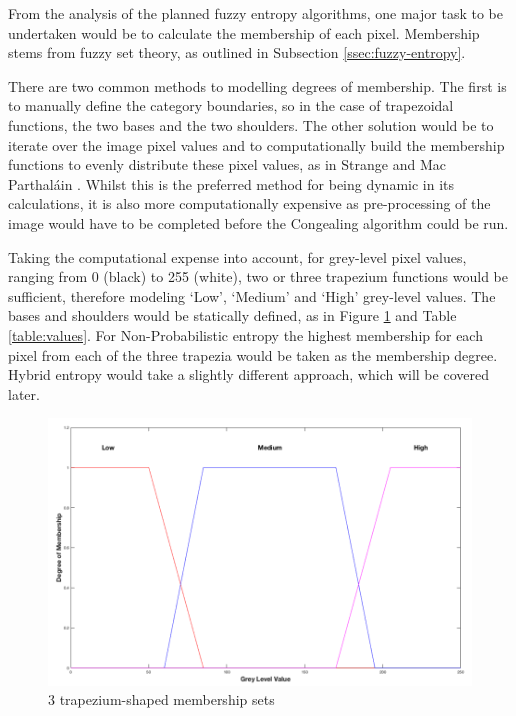 From the analysis of the planned fuzzy entropy algorithms, one major task to be undertaken would be to calculate the membership of each pixel. Membership stems from fuzzy set theory, as outlined in Subsection \ref{ssec:fuzzy-entropy}.

There are two common methods to modelling degrees of membership. The first is to manually define the category boundaries, so in the case of trapezoidal functions, the two bases and the two shoulders. The other solution would be to iterate over the image pixel values and to computationally build the membership functions to evenly distribute these pixel values, as in Strange and Mac Parthal\'ain \cite{Mac_Parthalain_Strange_2013}. Whilst this is the preferred method for being dynamic in its calculations, it is also more computationally expensive as pre-processing of the image would have to be completed before the \Gls{Congealing} algorithm could be run.

Taking the computational expense into account, for grey-level pixel values, ranging from 0 (black) to 255 (white), two or three trapezium functions would be sufficient, therefore modeling `Low', `Medium' and `High' grey-level values. The bases and shoulders would be statically defined, as in Figure \ref{fig:3-trapeziums} and Table \ref{table:values}. For Non-Probabilistic entropy the highest membership for each pixel from each of the three trapezia would be taken as the membership degree. Hybrid entropy would take a slightly different approach, which will be covered later.

\begin{figure}[H]
  \center
  \includegraphics[scale=0.4]{Chapter2/hybrid-img/3_traps.png}
  \caption{3 trapezium-shaped membership sets}
  \label{fig:3-trapeziums}
\end{figure}

